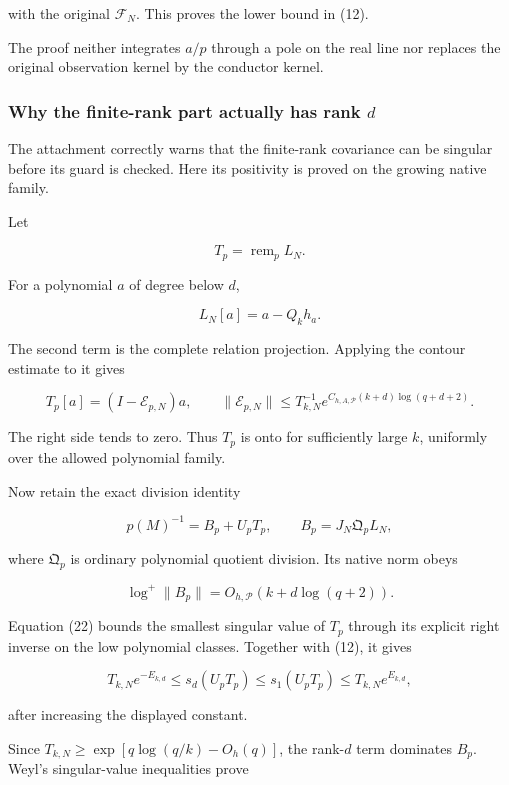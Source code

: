 \documentclass[11pt]{article}
\begin{document}
with the original \(\mathcal F_N\). This proves the lower bound in (12).

The proof neither integrates \(a/p\) through a pole on the real line nor replaces the original observation kernel by the conductor kernel.

\subsubsection{\texorpdfstring{Why the finite-rank part actually has rank \(d\)}{Why the finite-rank part actually has rank d}}\label{why-the-finite-rank-part-actually-has-rank-d}

The attachment correctly warns that the finite-rank covariance can be singular before its guard is checked. Here its positivity is proved on the growing native family.

Let

\[
T_p=\operatorname{rem}_pL_N.
\]

For a polynomial \(a\) of degree below \(d\),

\[
L_N[a]=a-Q_kh_a.
\]

The second term is the complete relation projection. Applying the contour estimate to it gives

\[
\boxed{
T_p[a]=(I-\mathcal E_{p,N})a,
\qquad
\|\mathcal E_{p,N}\|
\le
T_{k,N}^{-1}
e^{C_{h,A,\mathscr P}(k+d)\log(q+d+2)}.
}
\tag{22}
\]

The right side tends to zero. Thus \(T_p\) is onto for sufficiently large \(k\), uniformly over the allowed polynomial family.

Now retain the exact division identity

\[
\boxed{
p(M)^{-1}=B_p+U_pT_p,
\qquad
B_p=J_N\mathfrak Q_pL_N,
}
\tag{23}
\]

where \(\mathfrak Q_p\) is ordinary polynomial quotient division. Its native norm obeys

\[
\log^+\|B_p\|=O_{h,\mathscr P}(k+d\log(q+2)).
\]

Equation (22) bounds the smallest singular value of \(T_p\) through its explicit right inverse on the low polynomial classes. Together with (12), it gives

\[
T_{k,N}e^{-E_{k,d}}
\le s_d(U_pT_p)
\le s_1(U_pT_p)
\le T_{k,N}e^{E_{k,d}},
\]

after increasing the displayed constant.

Since \(T_{k,N}\ge\exp[q\log(q/k)-O_h(q)]\), the rank-\(d\) term dominates \(B_p\). Weyl's singular-value inequalities prove
\end{document}
